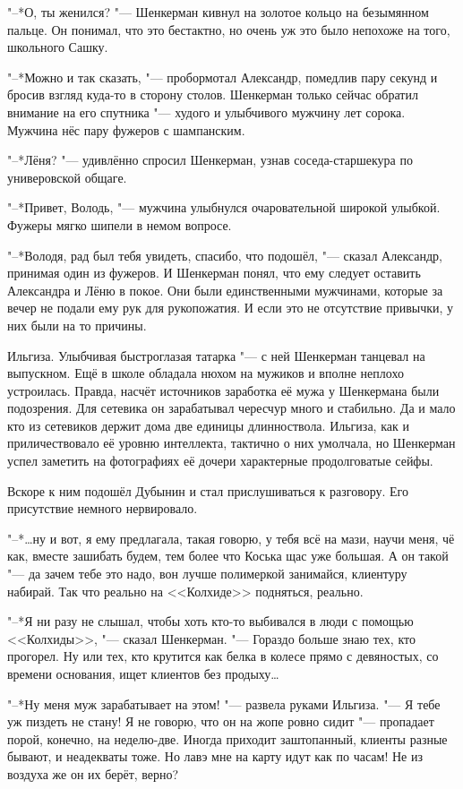 "--*О, ты женился? "--- Шенкерман кивнул на золотое кольцо на безымянном пальце.
Он понимал, что это бестактно, но очень уж это было непохоже на того, школьного Сашку.

"--*Можно и так сказать, "--- пробормотал Александр, помедлив пару секунд и бросив взгляд куда-то в сторону столов.
Шенкерман только сейчас обратил внимание на его спутника "--- худого и улыбчивого мужчину лет сорока.
Мужчина нёс пару фужеров с шампанским.

"--*Лёня? "--- удивлённо спросил Шенкерман, узнав соседа-старшекура по универовской общаге.

"--*Привет, Володь, "--- мужчина улыбнулся очаровательной широкой улыбкой.
Фужеры мягко шипели в немом вопросе.

"--*Володя, рад был тебя увидеть, спасибо, что подошёл, "--- сказал Александр, принимая один из фужеров.
И Шенкерман понял, что ему следует оставить Александра и Лёню в покое.
Они были единственными мужчинами, которые за вечер не подали ему рук для рукопожатия.
И если это не отсутствие привычки, у них были на то причины.

Ильгиза.
Улыбчивая быстроглазая татарка "--- с ней Шенкерман танцевал на выпускном.
Ещё в школе обладала нюхом на мужиков и вполне неплохо устроилась.
Правда, насчёт источников заработка её мужа у Шенкермана были подозрения.
Для сетевика он зарабатывал чересчур много и стабильно.
Да и мало кто из сетевиков держит дома две единицы длинноствола.
Ильгиза, как и приличествовало её уровню интеллекта, тактично о них умолчала, но Шенкерман успел заметить на фотографиях её дочери характерные продолговатые сейфы.

Вскоре к ним подошёл Дубынин и стал прислушиваться к разговору.
Его присутствие немного нервировало.

"--*\ldots{}ну и вот, я ему предлагала, такая говорю, у тебя всё на мази, научи меня, чё как, вместе зашибать будем, тем более что Коська щас уже большая.
А он такой "--- да зачем тебе это надо, вон лучше полимеркой занимайся, клиентуру набирай.
Так что реально на <<Колхиде>> подняться, реально.

"--*Я ни разу не слышал, чтобы хоть кто-то выбивался в люди с помощью <<Колхиды>>, "--- сказал Шенкерман.
"--- Гораздо больше знаю тех, кто прогорел.
Ну или тех, кто крутится как белка в колесе прямо с девяностых, со времени основания, ищет клиентов без продыху\ldots{}

"--*Ну меня муж зарабатывает на этом! "--- развела руками Ильгиза.
"--- Я тебе уж пиздеть не стану!
Я не говорю, что он на жопе ровно сидит "--- пропадает порой, конечно, на неделю-две.
Иногда приходит заштопанный, клиенты разные бывают, и неадекваты тоже.
Но лавэ мне на карту идут как по часам!
Не из воздуха же он их берёт, верно?

